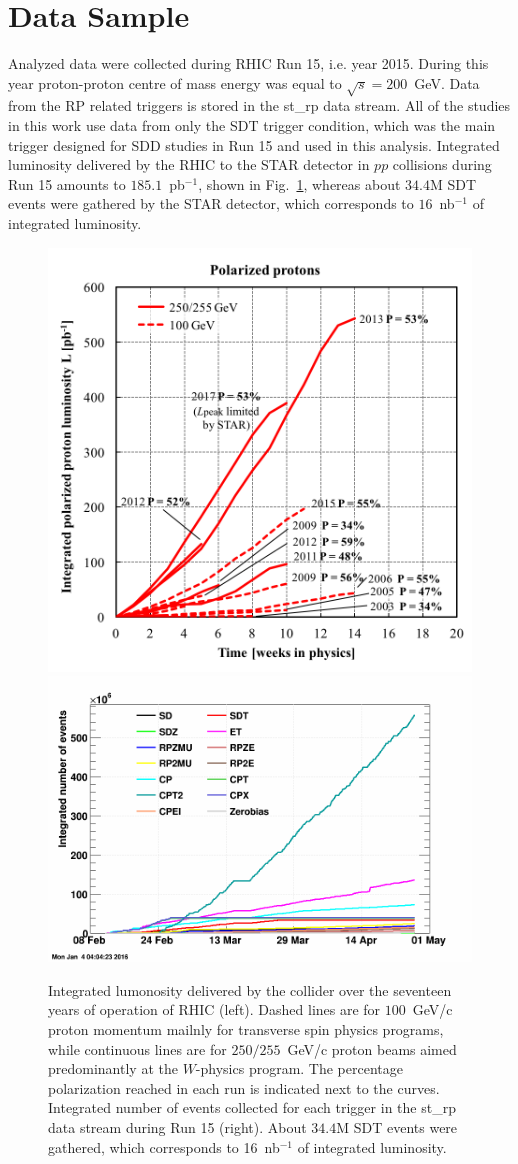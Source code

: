 \section{Data Sample}\label{section:star_data_sample}
Analyzed data were collected during RHIC Run 15, i.e. year 2015. During this year proton-proton centre of mass energy was equal to $\sqrt{s}=200$~GeV. Data from the RP related triggers is stored in the st\_rp data stream.  All of the studies in this work use data from only the SDT trigger condition, which was the main trigger designed for SDD studies in Run 15 and used in this analysis. Integrated luminosity delivered by the RHIC to the STAR detector in $pp$ collisions during Run 15 amounts to $185.1$~pb$^{-1}$\cite{RHIC:rhicRunLuminosity}, shown in Fig.~\ref{fig:lumiRHIC}, whereas about $34.4$M SDT events were gathered by the STAR detector, which corresponds to $16$~nb$^{-1}$ of integrated luminosity.

\begin{figure}[bh]
	\centering
	\includegraphics[width=.39\textwidth]{chapters/dataSampleSTAR/img/RhicLuminosityPP.png}
	\hfill
	\includegraphics[width=.6\textwidth]{chapters/dataSampleSTAR/img/nEvents.png}
	\caption[Integrated luminosity delivered by the collider over the seventeen years of operation of RHIC and integrated number of events collected for each trigger in the st\_rp data stream during Run 15]{Integrated lumonosity delivered by the collider over the seventeen years of operation of RHIC (left)\cite{RHIC:rhicRunLuminosity}. Dashed lines are for $100$~GeV/c proton momentum mailnly for transverse spin physics programs, while continuous lines are for $250/255$~GeV/c proton beams aimed predominantly at the $W$-physics program. The percentage polarization reached in each run is indicated next to the curves. Integrated number of events collected for each trigger in the st\_rp data stream during Run 15 (right). About $34.4$M SDT events were gathered, which  corresponds to 16~nb$^{-1}$ of integrated luminosity.}
	\label{fig:lumiRHIC}
\end{figure}

\FloatBarrier